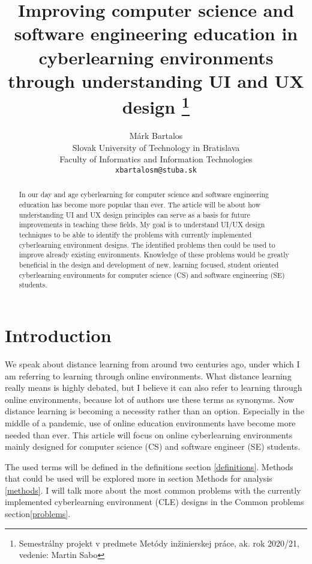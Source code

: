 \documentclass[10pt,english,a4paper]{article} %
\title{Improving computer science and software 
engineering education in cyberlearning 
environments through understanding UI and UX design
\thanks{Semestrálny projekt v predmete Metódy inžinierskej práce,
 ak. rok 2020/21, vedenie: Martin Sabo}}
\author{Márk Bartalos \\[2pt]
        \small{Slovak University of Technology in Bratislava}\\
        \small{Faculty of Informatics and Information Technologies}\\
        \small{\texttt{xbartalosm@stuba.sk}}
}
\begin{document}
\maketitle

\begin{abstract}
    In our day and age cyberlearning for computer science and software engineering education has become more popular than ever. 
The article will be about how understanding UI and UX design principles can serve as a basis for future improvements in teaching
these fields. My goal is to understand UI/UX design techniques to be able to identify the problems with currently 
implemented cyberlearning environment designs. The identified problems then could be used to improve already existing environments.
Knowledge of these problems would be greatly beneficial in the design and development of new, learning focused, student 
oriented cyberlearning environments for computer science (CS) and software engineering (SE) students.
\end{abstract}



\section{Introduction}
We speak about distance learning from around two centuries ago\cite{moore_2011_elearning}, under which
I am referring to learning through online environments. What distance learning really means is highly debated\cite{moore_2011_elearning},
but I believe it can also refer to learning through online environments, because lot of authors use these terms as
synonyms\cite{distance_definition}\cite{moore_2011_elearning}. 
Now distance learning is becoming a necessity rather than an option. Especially in the middle of a pandemic, use of online 
education environments have become more needed than ever. This article will focus on online cyberlearning environments 
mainly designed for computer science (CS) and software engineer (SE) students.


The used terms will be defined in the definitions section \ref{definitions}.
Methods that could be used will be explored more in section Methods for analysis \ref{methods}.
I will talk more about the most common problems with the currently implemented cyberlearning environment (CLE)
designs in the Common problems section\ref{problems}.
\end{document}

